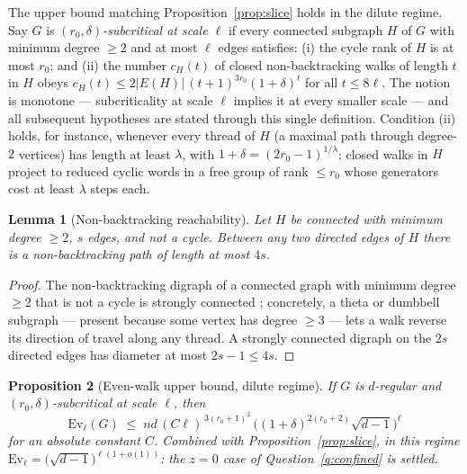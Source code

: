 \documentclass[11pt]{article}
\newtheorem{lemma}{Lemma}
\newtheorem{proposition}[lemma]{Proposition}
\theoremstyle{remark}
\begin{document}
The upper bound matching Proposition~\ref{prop:slice} holds in the
dilute regime. Say $G$ is \emph{$(r_0,\delta)$-subcritical at scale
$\ell$} if every connected subgraph $H$ of $G$ with minimum degree
$\ge2$ and at most $\ell$ edges satisfies: (i) the cycle rank of $H$
is at most $r_0$; and (ii) the number $c_H(t)$ of closed
non-backtracking walks of length $t$ in $H$ obeys
$c_H(t)\le 2|E(H)|\,(t+1)^{3r_0}(1+\delta)^{t}$ for all $t\le8\ell$.
The notion is monotone --- subcriticality at scale $\ell$ implies it
at every smaller scale --- and all subsequent hypotheses are stated
through this single definition.
Condition (ii) holds, for instance, whenever every thread of $H$ (a
maximal path through degree-$2$ vertices) has length at least
$\lambda$, with $1+\delta=(2r_0-1)^{1/\lambda}$: closed walks in $H$
project to reduced cyclic words in a free group of rank $\le r_0$ whose
generators cost at least $\lambda$ steps each.

\begin{lemma}[Non-backtracking reachability]\label{lem:reach}
Let $H$ be connected with minimum degree $\ge2$, $s$ edges, and not a
cycle. Between any two directed edges of $H$ there is a
non-backtracking path of length at most $4s$.
\end{lemma}

\begin{proof}
The non-backtracking digraph of a connected graph with minimum degree
$\ge2$ that is not a cycle is strongly connected \cite{ks00};
concretely, a theta or dumbbell subgraph --- present because some
vertex has degree $\ge3$ --- lets a walk reverse its direction of
travel along any thread. A strongly connected digraph on the $2s$
directed edges has diameter at most $2s-1\le4s$.
\end{proof}

\begin{proposition}[Even-walk upper bound, dilute regime]\label{prop:upper}
If $G$ is $d$-regular and $(r_0,\delta)$-subcritical at scale $\ell$,
then
\[
\mathrm{Ev}_\ell(G)\;\le\;
nd\,(C\ell)^{\,3(r_0+1)^2}\,
\Big((1+\delta)^{2(r_0+2)}\sqrt{d-1}\Big)^{\ell}
\]
for an absolute constant $C$. Combined with
Proposition~\ref{prop:slice}, in this regime
$\mathrm{Ev}_\ell=\big(\sqrt{d-1}\big)^{\ell(1+o(1))}$: the $z=0$ case
of Question~\ref{q:confined} is settled.
\end{proposition}
\end{document}
